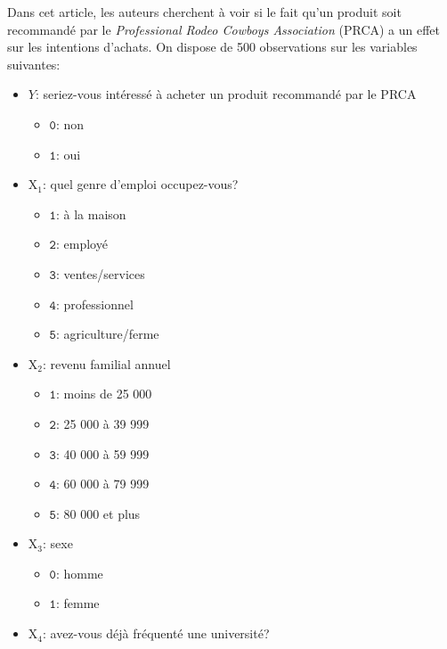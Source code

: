 \documentclass[
  11pt,
  letterpaper,
]{scrbook}
\providecommand{\tightlist}{%
  \setlength{\itemsep}{0pt}\setlength{\parskip}{0pt}}\usepackage{longtable,booktabs,array}
\theoremstyle{definition}
\theoremstyle{remark}
\begin{document}
Dans cet article, les auteurs cherchent à voir si le fait qu'un produit
soit recommandé par le \emph{Professional Rodeo Cowboys Association}
(PRCA) a un effet sur les intentions d'achats. On dispose de 500
observations sur les variables suivantes:

\begin{itemize}
\tightlist
\item
  \(Y\): seriez-vous intéressé à acheter un produit recommandé par le
  PRCA

  \begin{itemize}
  \tightlist
  \item
    \(\texttt{0}\): non
  \item
    \(\texttt{1}\): oui
  \end{itemize}
\item
  \(\mathrm{X}_1\): quel genre d'emploi occupez-vous?

  \begin{itemize}
  \tightlist
  \item
    \(\texttt{1}\): à la maison
  \item
    \(\texttt{2}\): employé
  \item
    \(\texttt{3}\): ventes/services
  \item
    \(\texttt{4}\): professionnel
  \item
    \(\texttt{5}\): agriculture/ferme
  \end{itemize}
\item
  \(\mathrm{X}_2\): revenu familial annuel

  \begin{itemize}
  \tightlist
  \item
    \(\texttt{1}\): moins de 25 000
  \item
    \(\texttt{2}\): 25 000 à 39 999
  \item
    \(\texttt{3}\): 40 000 à 59 999
  \item
    \(\texttt{4}\): 60 000 à 79 999
  \item
    \(\texttt{5}\): 80 000 et plus
  \end{itemize}
\item
  \(\mathrm{X}_3\): sexe

  \begin{itemize}
  \tightlist
  \item
    \(\texttt{0}\): homme
  \item
    \(\texttt{1}\): femme
  \end{itemize}
\item
  \(\mathrm{X}_4\): avez-vous déjà fréquenté une université?


\end{itemize}
\end{document}
